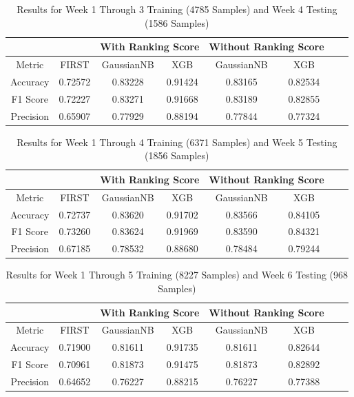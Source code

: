 \documentclass{article}
\begin{document}
\begin{table}[H]
    \caption{Results for Week 1 Through 3 Training (4785 Samples) and Week 4 Testing (1586 Samples)}
    \centering
    \begin{tabular} { |c|c|c|c|c|c|c|c| }
    \hline
    \multicolumn{2}{|c|}{} & \multicolumn{2}{|c|}{With Ranking Score} & \multicolumn{2}{|c|}{Without Ranking Score} \\
    \hline
    Metric & FIRST & GaussianNB & XGB & GaussianNB & XGB \\
    \hline
    Accuracy & 0.72572 & 0.83228 & 0.91424 & 0.83165 & 0.82534 \\
    \hline
    F1 Score & 0.72227 & 0.83271 & 0.91668 & 0.83189 & 0.82855 \\
    \hline
    Precision & 0.65907 & 0.77929 & 0.88194 & 0.77844 & 0.77324 \\
    \hline
    \end{tabular}
    \label{table:results_week_3}
\end{table}

\begin{table}[H]
    \caption{Results for Week 1 Through 4 Training (6371 Samples) and Week 5 Testing (1856 Samples)}
    \centering
    \begin{tabular} { |c|c|c|c|c|c|c|c| }
    \hline
    \multicolumn{2}{|c|}{} & \multicolumn{2}{|c|}{With Ranking Score} & \multicolumn{2}{|c|}{Without Ranking Score} \\
    \hline
    Metric & FIRST & GaussianNB & XGB & GaussianNB & XGB \\
    \hline
    Accuracy & 0.72737 & 0.83620 & 0.91702 & 0.83566 & 0.84105 \\
    \hline
    F1 Score & 0.73260 & 0.83624 & 0.91969 & 0.83590 & 0.84321 \\
    \hline
    Precision & 0.67185 & 0.78532 & 0.88680 & 0.78484 & 0.79244 \\
    \hline
    \end{tabular}
    \label{table:results_week_4}
\end{table}

\begin{table}[H]
    \caption{Results for Week 1 Through 5 Training (8227 Samples) and Week 6 Testing (968 Samples)}
    \centering
    \begin{tabular} { |c|c|c|c|c|c|c|c| }
    \hline
    \multicolumn{2}{|c|}{} & \multicolumn{2}{|c|}{With Ranking Score} & \multicolumn{2}{|c|}{Without Ranking Score} \\
    \hline
    Metric & FIRST & GaussianNB & XGB & GaussianNB & XGB \\
    \hline
    Accuracy & 0.71900 & 0.81611 & 0.91735 & 0.81611 & 0.82644 \\
    \hline
    F1 Score & 0.70961 & 0.81873 & 0.91475 & 0.81873 & 0.82892 \\
    \hline
    Precision & 0.64652 & 0.76227 & 0.88215 & 0.76227 & 0.77388 \\
    \hline
    \end{tabular}
    \label{table:results_week_5}
\end{table}
\end{document}
